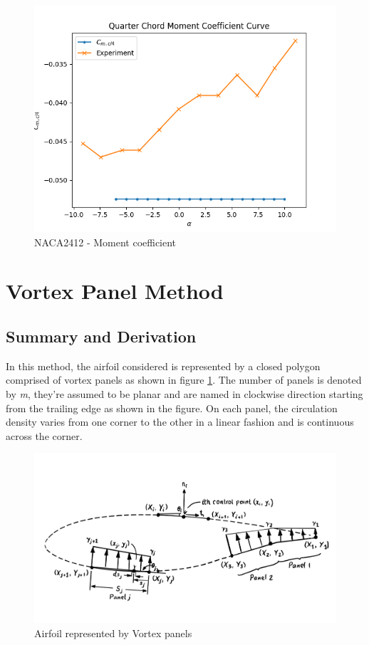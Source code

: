 \documentclass[letterpaper,12pt]{article}
\begin{document}
\begin{figure}[H]
\includegraphics[scale=0.8]{1.7_cm_2412}
\centering
\caption{NACA2412 - Moment coefficient}
\end{figure}

\pagebreak%

\section{Vortex Panel Method}
\subsection{Summary and Derivation \cite{chow}}

In this method, the airfoil considered is represented by a closed polygon comprised of vortex panels as shown in figure \ref{vortex-panel}. The number of panels is denoted by \textit{m}, they\rq{}re assumed to be planar and are named in clockwise direction starting from the trailing edge as shown in the figure. On each panel, the circulation density varies from one corner to the other in a linear fashion and is continuous across the corner.

\begin{figure}[H]
\includegraphics[scale=0.4]{2.1_panels}
\centering
\caption{Airfoil represented by Vortex panels}
\label{vortex-panel}
\end{figure}
\end{document}
